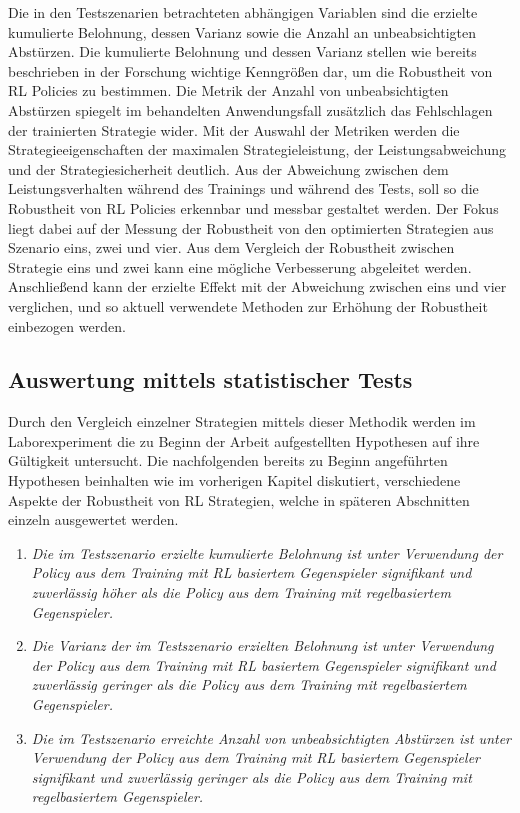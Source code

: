 Die in den Testszenarien betrachteten abhängigen Variablen sind die erzielte kumulierte Belohnung, dessen Varianz sowie die Anzahl an unbeabsichtigten Abstürzen.
Die kumulierte Belohnung und dessen Varianz stellen wie bereits beschrieben in der Forschung wichtige Kenngrößen dar, um die Robustheit von RL Policies zu bestimmen.
Die Metrik der Anzahl von unbeabsichtigten Abstürzen spiegelt im behandelten Anwendungsfall zusätzlich das Fehlschlagen der trainierten Strategie wider.
Mit der Auswahl der Metriken werden die Strategieeigenschaften der maximalen Strategieleistung, der Leistungsabweichung und der Strategiesicherheit deutlich.
Aus der Abweichung zwischen dem Leistungsverhalten während des Trainings und während des Tests, soll so die Robustheit von RL Policies erkennbar und messbar gestaltet werden.
Der Fokus liegt dabei auf der Messung der Robustheit von den optimierten Strategien aus Szenario eins, zwei und vier.
Aus dem Vergleich der Robustheit zwischen Strategie eins und zwei kann eine mögliche Verbesserung abgeleitet werden.
Anschließend kann der erzielte Effekt mit der Abweichung zwischen eins und vier verglichen, und so aktuell verwendete Methoden zur Erhöhung der Robustheit einbezogen werden.

\subsection{Auswertung mittels statistischer Tests}

Durch den Vergleich einzelner Strategien mittels dieser Methodik werden im Laborexperiment die zu Beginn der Arbeit aufgestellten Hypothesen auf ihre Gültigkeit untersucht.
Die nachfolgenden bereits zu Beginn angeführten Hypothesen beinhalten wie im vorherigen Kapitel diskutiert, verschiedene Aspekte der Robustheit von RL Strategien, welche in späteren Abschnitten einzeln ausgewertet werden.
\begin{enumerate}
    \item \textit{Die im Testszenario erzielte kumulierte Belohnung ist unter Verwendung der Policy aus dem Training mit RL basiertem Gegenspieler signifikant und zuverlässig höher als die Policy aus dem Training mit regelbasiertem Gegenspieler.}
    \item \textit{Die Varianz der im Testszenario erzielten Belohnung ist unter Verwendung der Policy aus dem Training mit RL basiertem Gegenspieler signifikant und zuverlässig geringer als die Policy aus dem Training mit regelbasiertem Gegenspieler.}
    \item \textit{Die im Testszenario erreichte Anzahl von unbeabsichtigten Abstürzen ist unter Verwendung der Policy aus dem Training mit RL basiertem Gegenspieler signifikant und zuverlässig geringer als die Policy aus dem Training mit regelbasiertem Gegenspieler.}
\end{enumerate}

